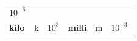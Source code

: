 {{\begin{center}
\begin{xtabular}[t]{|l|l|l|l|l|l|}
        
                \begin{math}{10}^{-6}\end{math}
     \tabularnewline{}
    
    
        
                \textbf{kilo}
               &
    
    
        k &
    
    
        
                \begin{math}{10}^{3}\end{math}
               &
    
    
        
                \textbf{milli}
               &
    
    
        m &
    
    
        
                \begin{math}{10}^{-3}\end{math}
     \tabularnewline{}
    

\end{xtabular}
\end{center}}}
